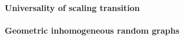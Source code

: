 \paragraph{Universality of scaling transition}

\paragraph{Geometric inhomogeneous random graphs}

%


